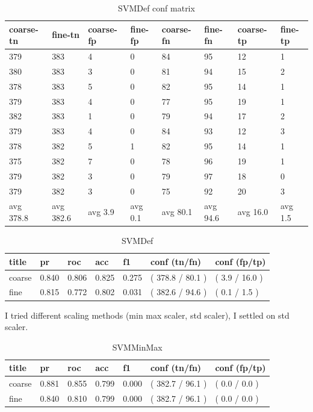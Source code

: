 \documentclass[ms]{nuthesis}
\begin{document}
\FloatBarrier
\begin{table}[h]
\centering
\begin{tabular}{|l||l||l||l||l||l||l||l|}\toprule
coarse-tn & fine-tn & coarse-fp & fine-fp & coarse-fn & fine-fn & coarse-tp & fine-tp \\ \midrule
379 & 383 & 4 & 0 & 84 & 95 & 12 & 1 \\
380 & 383 & 3 & 0 & 81 & 94 & 15 & 2 \\
378 & 383 & 5 & 0 & 82 & 95 & 14 & 1 \\
379 & 383 & 4 & 0 & 77 & 95 & 19 & 1 \\
382 & 383 & 1 & 0 & 79 & 94 & 17 & 2 \\
379 & 383 & 4 & 0 & 84 & 93 & 12 & 3 \\
378 & 382 & 5 & 1 & 82 & 95 & 14 & 1 \\
375 & 382 & 7 & 0 & 78 & 96 & 19 & 1 \\
379 & 382 & 3 & 0 & 79 & 97 & 18 & 0 \\
379 & 382 & 3 & 0 & 75 & 92 & 20 & 3 \\
avg 378.8 & avg 382.6 & avg 3.9 & avg 0.1 & avg 80.1 & avg 94.6 & avg 16.0 & avg 1.5 \\ \bottomrule
\end{tabular}
\caption{SVMDef conf matrix}
\label{tab:SVMDefConfMat}
\end{table}
\FloatBarrier


\FloatBarrier
\begin{table}[h]
\centering
\begin{tabular}{|l||l||l||l||l||l||l|}\toprule
title & pr & roc & acc & f1 & conf (tn/fn) & conf (fp/tp) \\ \midrule
coarse & 0.840 & 0.806 & 0.825 & 0.275 & ( 378.8 / 80.1 ) & ( 3.9 / 16.0 ) \\
fine & 0.815 & 0.772 & 0.802 & 0.031 & ( 382.6 / 94.6 ) & ( 0.1 / 1.5 ) \\ \bottomrule
\end{tabular}
\caption{SVMDef}
\label{tab:SVMDef}
\end{table}
\FloatBarrier




\par I tried different scaling methods (min max scaler, std scaler), I settled on std scaler.

\FloatBarrier
\begin{table}[h]
\centering
\begin{tabular}{|l||l||l||l||l||l||l|}\toprule
title & pr & roc & acc & f1 & conf (tn/fn) & conf (fp/tp) \\ \midrule
coarse & 0.881 & 0.855 & 0.799 & 0.000 & ( 382.7 / 96.1 ) & ( 0.0 / 0.0 ) \\
fine & 0.840 & 0.810 & 0.799 & 0.000 & ( 382.7 / 96.1 ) & ( 0.0 / 0.0 ) \\ \bottomrule
\end{tabular}
\caption{SVMMinMax}
\label{tab:SVMMinMax}
\end{table}
\FloatBarrier
\end{document}
